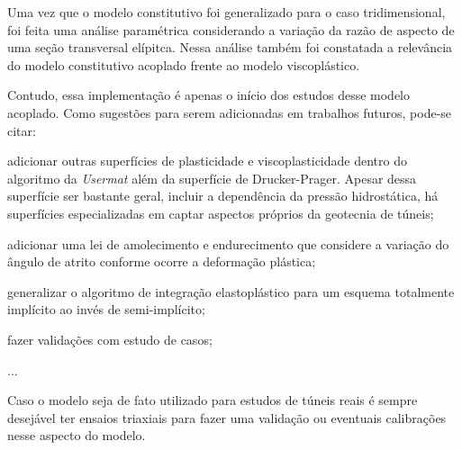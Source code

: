 Uma vez que o modelo constitutivo foi generalizado para o caso tridimensional, foi feita uma análise paramétrica considerando a variação da razão de aspecto de uma seção transversal elípitca. Nessa análise também foi constatada a relevância do modelo constitutivo acoplado frente ao modelo viscoplástico.

Contudo, essa implementação é apenas o início dos estudos desse modelo acoplado. Como sugestões para serem adicionadas em trabalhos futuros, pode-se citar:

\begin{alineas}
	
	\item adicionar outras superfícies de plasticidade e viscoplasticidade dentro do algoritmo da \textit{Usermat} além da superfície de Drucker-Prager. Apesar dessa superfície ser bastante geral, incluir a dependência da pressão hidrostática, há superfícies especializadas em captar aspectos próprios da geotecnia de túneis;
	
	\item adicionar uma lei de amolecimento e endurecimento que considere a variação do ângulo de atrito conforme ocorre a deformação plástica;
	
	\item generalizar o algoritmo de integração elastoplástico para um esquema totalmente implícito ao invés de semi-implícito;
	
	\item fazer validações com estudo de casos;
	
	\item ...
	
\end{alineas}


Caso o modelo seja de fato utilizado para estudos de túneis reais é sempre desejável ter ensaios triaxiais para fazer uma validação ou eventuais calibrações nesse aspecto do modelo.